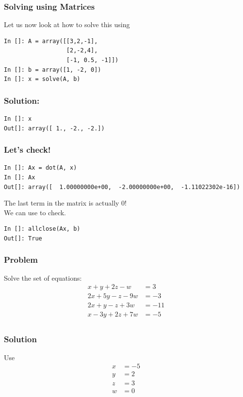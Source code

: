 \documentclass[14pt,compress]{beamer}
\newcounter{time}
\newcommand{\inctime}[1]{\addtocounter{time}{#1}{\tiny \thetime\ m}}
\newcommand{\kwrd}[1]{ \texttt{\textbf{\color{blue}{#1}}}  }
\begin{document}
\begin{frame}[fragile]
\frametitle{Solving using Matrices}
Let us now look at how to solve this using \kwrd{matrices}
  \begin{lstlisting}
In []: A = array([[3,2,-1],
                  [2,-2,4],                   
                  [-1, 0.5, -1]])
In []: b = array([1, -2, 0])
In []: x = solve(A, b)
  \end{lstlisting}
\end{frame}

\begin{frame}[fragile]
\frametitle{Solution:}
\begin{lstlisting}
In []: x
Out[]: array([ 1., -2., -2.])
\end{lstlisting}
\end{frame}

\begin{frame}[fragile]
\frametitle{Let's check!}
\begin{small}
\begin{lstlisting}
In []: Ax = dot(A, x)
In []: Ax
Out[]: array([  1.00000000e+00,  -2.00000000e+00,  -1.11022302e-16])
\end{lstlisting}
\end{small}
\begin{block}{}
The last term in the matrix is actually \alert{0}!\\
We can use \kwrd{allclose()} to check.
\end{block}
\begin{lstlisting}
In []: allclose(Ax, b)
Out[]: True
\end{lstlisting}
\inctime{10}
\end{frame}

\begin{frame}[fragile]
\frametitle{Problem}
Solve the set of equations:
\begin{align*}
  x + y + 2z -w & = 3\\
  2x + 5y - z - 9w & = -3\\
  2x + y -z + 3w & = -11 \\
  x - 3y + 2z + 7w & = -5\\
\end{align*}
\inctime{5}
\end{frame}

\begin{frame}[fragile]
\frametitle{Solution}
Use \kwrd{solve()}
\begin{align*}
  x & = -5\\
  y & = 2\\
  z & = 3\\
  w & = 0\\
\end{align*}
\end{frame}
\end{document}
